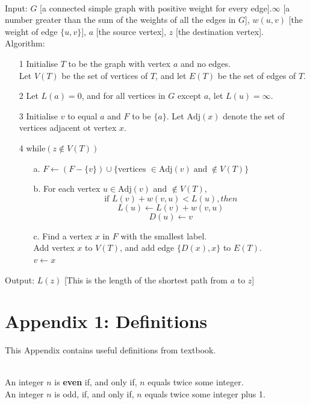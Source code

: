 \documentclass[12pt]{article}
\begin{document}
\begin{algorithm}[Dijkstra]
\hfill\\
\normalfont Input: $G$ [a connected simple graph with positive weight for every edge].$\infty$ [a number greater than the sum of the weights of all the edges in $G$], $w(u,v)$ [the weight of edge $\{u,v\}$], $a$ [the source vertex], $z$ [the destination vertex].\\
Algorithm:\\
\begin{enumerate}
\item[1] Initialise $T$ to be the graph with vertex $a$ and no edges.\\Let $V(T)$ be the set of vertices of $T$, and let $E(T)$ be the set of edges of $T$.
\item[2] Let $L(a)=0$, and for all vertices in $G$ except $a$, let $L(u)=\infty$.
\item[3] Initialise $v$ to equal $a$ and $F$ to be $\{a\}$. \newline
Let $\text{Adj}(x)$ denote the set of vertices adjacent ot vertex $x$.
\item[4] while$(z\notin V(T))$
\begin{itemize}
\item[a.] $F\leftarrow (F-\{v\})\cup\{\text{vertices }\in \text{Adj}(v)\;\text{and}\;\notin V(T)\}$
\item[b.] For each vertex $u\in\text{Adj}(v)$ and $\notin V(T)$,
\[
\text{if }L(v)+w(v,u)<L(u), then
\]
\[
L(u)\leftarrow L(v)+w(v,u)
\]
\[
D(u)\leftarrow v
\]
\item[c.] Find a vertex $x$ in $F$ with the smallest label.\\ Add vertex $x$ to $V(T)$, and add edge $\{D(x),x\}$ to $E(T)$.\\$v\leftarrow x$
\end{itemize}
\end{enumerate}
Output: $L(z)$ [This is the length of the shortest path from $a$ to $z$]
\end{algorithm}



\clearpage
\section{Appendix 1: Definitions}
This Appendix contains useful definitions from textbook.
\begin{definition}
\hfill\\
\normalfont An integer $n$ is \textbf{even} if, and only if, $n$ equals twice some integer. \\
An integer $n$ is odd, if, and only if, $n$ equals twice some integer plus 1.
\end{definition}
\end{document}
